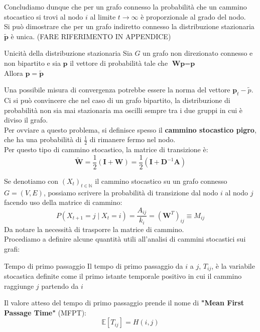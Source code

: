Concludiamo dunque che per un grafo connesso la probabilità che un cammino stocastico si trovi al nodo $i$ al limite $t \to \infty$ è proporzionale al grado del nodo.\\

Si può dimostrare che per un grafo indiretto connesso la distribuzione stazionaria $\mathbf{\tilde{p}}$ è unica. (FARE RIFERIMENTO IN APPENDICE)
\begin{boxl}{Unicità della distribuzione stazionaria}
Sia $G$ un grafo non direzionato connesso e non bipartito e sia $\textbf{p}$ il vettore di probabilità tale che $\textbf{Wp}=\textbf{p}$\\
Allora $\mathbf{p}=\mathbf{\mathbf{\tilde{p}}}$
\end{boxl}


Una possibile misura di convergenza potrebbe essere la norma del vettore $\mathbf{p}_t-\tilde{p}$.
Ci si può convincere che nel caso di un grafo bipartito, la distribuzione di probabilità non sia mai stazionaria ma oscilli sempre tra i due gruppi in cui è diviso il grafo.\\

Per ovviare a questo problema, si definisce spesso il \textbf{cammino stocastico pigro}, che ha una probabilità di $\frac{1}{2}$ di rimanere fermo nel nodo.\\

Per questo tipo di cammino stocastico, la matrice di transizione è:
\begin{equation}
    \tilde{\mathbf{W}}=\frac{1}{2}(\mathbf{I}+\mathbf{W})=\frac{1}{2}(\mathbf{I}+\mathbf{D}^{-1}\mathbf{A})
\end{equation}


Se denotiamo con $(X_t)_{t \in \mathbb{N}}$ il cammino stocastico su un grafo connesso $G=(V,E)$, possiamo scrivere la probabilità di transizione dal nodo $i$ al nodo $j$ facendo uso della matrice di cammino:
\begin{equation}
    P(X_{t+1}=j \mid X_t=i)=\frac{A_{ij}}{k_i}=(\mathbf{W}^T)_{ij}\equiv M_{ij}
\end{equation}
Da notare la necessità di trasporre la matrice di cammino.\\

Procediamo a definire alcune quantità utili all'analisi di cammini stocastici sui grafi:
\begin{boxb}{Tempo di primo passaggio}
Il tempo di primo passaggio da $i$ a $j$, $T_{ij}$, è la variabile stocastica definite come il primo istante temporale positivo in cui il cammino raggiunge $j$ partendo da $i$
\end{boxb}
Il valore atteso del tempo di primo passaggio prende il nome di \textbf{"Mean First Passage Time"}  (MFPT):
\begin{equation}
    \mathbb{E}[T_{ij}]=H(i,j)
\end{equation}

